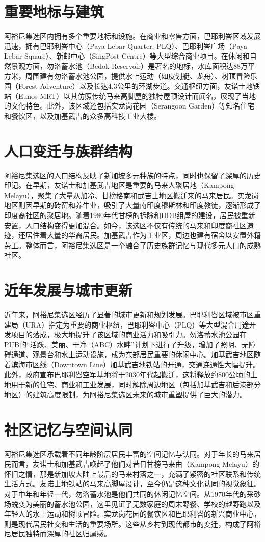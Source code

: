 \documentclass[11pt,a4paper,twoside,openany]{book}
\begin{document}
\section{重要地标与建筑}
阿裕尼集选区内拥有多个重要地标和设施。在商业和零售方面，巴耶利峇区域发展迅速，拥有巴耶利峇中心（Paya Lebar Quarter, PLQ）、巴耶利峇广场（Paya Lebar Square）、新邮中心（SingPost Centre）等大型综合商业项目。在休闲和自然景观方面，勿洛蓄水池（Bedok Reservoir）是著名的地标，水库面积达88万平方米，周围建有勿洛蓄水池公园，提供水上运动（如皮划艇、龙舟）、树顶冒险乐园（Forest Adventure）以及长达4.3公里的环湖步道。交通枢纽方面，友诺士地铁站（Eunos MRT）以其仿照传统马来高脚屋的独特屋顶设计而闻名，展现了当地的文化特色。此外，该区域还包括实龙岗花园（Serangoon Garden）等知名住宅和餐饮区，以及加基武吉的众多高科技工业大楼。

\section{人口变迁与族群结构}
阿裕尼集选区的人口结构反映了新加坡多元种族的特点，同时也保留了深厚的历史印记。在早期，友诺士和加基武吉地区是重要的马来人聚居地（Kampong Melayu），聚集了大量从加冷、甘榜格南和武吉士地区搬迁来的马来居民。实龙岗地区则因早期的砖窑和养牛业，吸引了大量南印度穆斯林和印度教徒，逐渐形成了印度裔社区的聚居地。随着1980年代甘榜的拆除和HDB组屋的建设，居民被重新安置，人口结构变得更加混合。如今，该选区不仅有传统的马来和印度裔社区遗迹，还居住着大量的华裔居民。加基武吉作为工业区，周边也建有宿舍以安置外籍劳工。整体而言，阿裕尼集选区是一个融合了历史族群记忆与现代多元人口的成熟社区。

\section{近年发展与城市更新}
近年来，阿裕尼集选区经历了显著的城市更新和规划发展。巴耶利峇区域被市区重建局（URA）指定为重要的商业枢纽，巴耶利峇中心（PLQ）等大型混合用途开发项目的落成，极大地提升了该区域的商业活力和吸引力。勿洛蓄水池公园在PUB的“活跃、美丽、干净（ABC）水畔”计划下进行了升级，增加了照明、无障碍通道、观景台和水上运动设施，成为东部居民重要的休闲中心。加基武吉地区随着滨海市区线（Downtown Line）加基武吉地铁站的开通，交通连通性大幅提升。此外，政府宣布巴耶利峇空军基地将于2030年代起搬迁，这将释放约800公顷的土地用于新的住宅、商业和工业发展，同时解除周边地区（包括加基武吉和后港部分地区）的建筑高度限制，为阿裕尼集选区未来的城市重塑提供了巨大的潜力。

\section{社区记忆与空间认同}
阿裕尼集选区承载着不同年龄阶层居民丰富的空间记忆与认同。对于年长的马来居民而言，友诺士和加基武吉唤起了他们对昔日甘榜马来由（Kampong Melayu）的怀旧之情，那是新加坡大陆上最后的马来村落之一，充满了紧密的社区联系和传统生活方式。友诺士地铁站的马来高脚屋设计，至今仍是这种文化认同的视觉象征。对于中年和年轻一代，勿洛蓄水池是他们共同的休闲记忆空间。从1970年代的采砂场蜕变为美丽的蓄水池公园，这里见证了无数家庭的周末野餐、学校的越野跑以及年轻人的水上运动和树顶冒险。实龙岗花园的餐饮区和巴耶利峇的新兴商业中心，则是现代居民社交和生活的重要场所。这些从乡村到现代都市的变迁，构成了阿裕尼居民独特而深厚的社区归属感。
\end{document}
